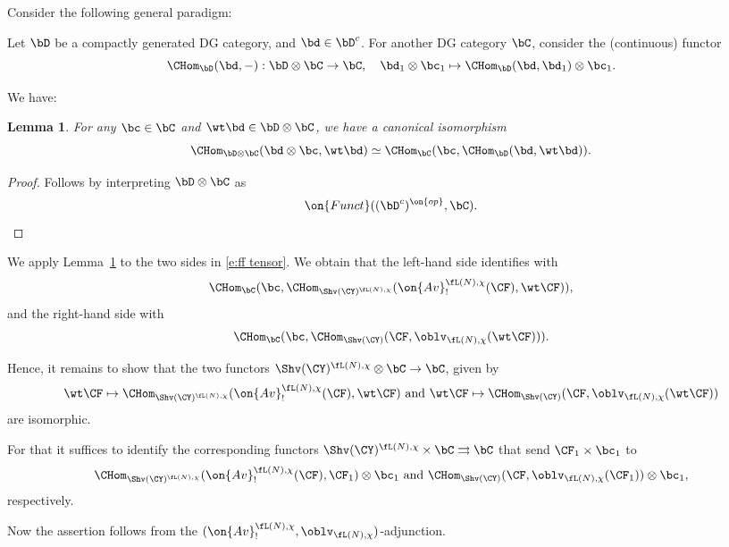 \documentclass[9pt]{amsart}
\newtheorem{lem}[subsubsection]{Lemma}
\theoremstyle{definition}
\theoremstyle{remark}
\newcommand{\lemref}[1]{Lemma~\ref{#1}}
\numberwithin{equation}{section}
\begin{document}
\sssec{}

Consider the following general paradigm:

\medskip

Let $\bD$ be a compactly generated DG category, and $\bd \in \bD^c$. For another DG category $\bC$, consider
the (continuous) functor
$$\CHom_{\bD}(\bd,-):\bD\otimes \bC\to \bC, \quad \bd_1\otimes \bc_1\mapsto \CHom_\bD(\bd,\bd_1)\otimes \bc_1.$$

\medskip

We have:

\begin{lem} \label{l:internal Hom}
For any $\bc\in \bC$ and $\wt\bd\in \bD\otimes \bC$,
we have a canonical isomorphism
$$\CHom_{\bD\otimes \bC}(\bd\otimes \bc,\wt\bd)\simeq \CHom_{\bC}(\bc, \CHom_{\bD}(\bd,\wt\bd)).$$
\end{lem} 

\begin{proof}

Follows by interpreting $\bD\otimes \bC$ as 
$$\on{Funct}((\bD^c)^{\on{op}},\bC).$$

\end{proof}

\sssec{}

We apply \lemref{l:internal Hom} to the two sides in \eqref{e:ff tensor}. We obtain that the left-hand side identifies with
$$\CHom_{\bC}(\bc,\CHom_{\Shv(\CY)^{\fL(N),\chi}}(\on{Av}^{\fL(N),\chi}_!(\CF),\wt\CF)),$$
and the right-hand side with 
$$\CHom_{\bC}(\bc,\CHom_{\Shv(\CY)}(\CF,\oblv_{\fL(N),\chi}(\wt\CF))).$$

\medskip

Hence, it remains to show that the two functors $\Shv(\CY)^{\fL(N),\chi}\otimes \bC\to \bC$, given by
$$\wt\CF\mapsto \CHom_{\Shv(\CY)^{\fL(N),\chi}}(\on{Av}^{\fL(N),\chi}_!(\CF),\wt\CF) \text{ and }
\wt\CF\mapsto \CHom_{\Shv(\CY)}(\CF,\oblv_{\fL(N),\chi}(\wt\CF))$$
are isomorphic.

\medskip

For that it suffices to identify the corresponding functors $\Shv(\CY)^{\fL(N),\chi}\times \bC\rightrightarrows \bC$
that send $\CF_1\times \bc_1$ to 
$$\CHom_{\Shv(\CY)^{\fL(N),\chi}}(\on{Av}^{\fL(N),\chi}_!(\CF),\CF_1)\otimes \bc_1 \text{ and }
\CHom_{\Shv(\CY)}(\CF,\oblv_{\fL(N),\chi}(\CF_1))\otimes \bc_1,$$
respectively.

\medskip

Now the assertion follows from the $(\on{Av}^{\fL(N),\chi}_!,\oblv_{\fL(N),\chi})$-adjunction. 
\end{document}
